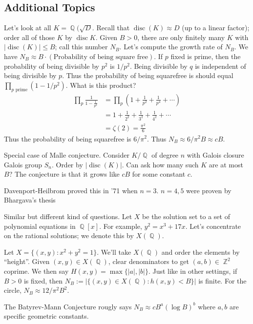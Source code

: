 \documentclass[11pt, a4paper]{memoir}
\DeclareMathOperator{\Q}{{\mathbb{Q}}}
\DeclareMathOperator{\Z}{{\mathbb{Z}}}
\theoremstyle{change}
\theoremstyle{plain}
\theoremstyle{nonumberplain}
\DeclareMathOperator{\disc}{disc}
\numberwithin{equation}{section}
\begin{document}
\subsection{Additional Topics}
Let's look at all $K=\Q(\sqrt{D}$.
Recall that $\disc(K)\approx D$ (up to a linear factor); order all of those $K$ by $\disc K$.
Given $B>0$, there are only finitely many $K$ with $|\disc(K)|\leq B$; call this number $N_B$.
Let's compute the growth rate of $N_B$.
We have $N_B\approx B\cdot(\text{Probability of being square free})$.
If $p$ fixed is prime, then the probability of being divisible by $p^2$ is $1/p^2$.
Being divisible by $q$ is independent of being divisible by $p$.
Thus the probability of being squarefree is should equal $\prod_{p\text{ prime}}(1-1/p^2)$.
What is this product?
\begin{align*}
    \prod_p\frac{1}{1-\frac{1}{p^2}} &= \prod_p\left(1+\frac{1}{p^2}+\frac{1}{p^4}+\cdots\right)\\
                                     &= 1+\frac{1}{2^2}+\frac{1}{3^2}+\frac{1}{4^2}+\cdots\\
                                     &= \zeta(2)=\frac{\pi^2}{6}
\end{align*}
Thus the probability of being squarefree is $6/\pi^2$.
Thus $N_B\approx 6/\pi^2 B\approx cB$.

Special case of Malle conjecture.
Consider $K/\Q$ of degree $n$ with Galois closure Galois group $S_n$.
Order by $|\disc(K)|$.
Can ask how many such $K$ are at most $B$?
The conjecture is that it grows like $cB$ for some constant $c$.

Davenport-Heilbrom proved this in '71 when $n=3$.
$n=4,5$ were proven by Bhargava's thesis

Similar but different kind of questions.
Let $X$ be the solution set to a set of polynomial equations in $\Q[x]$.
For example, $y^2=x^3+17x$.
Let's concentrate on the rational solutions; we denote this by $X(\Q)$.

Let $X=\{(x,y):x^2+y^2=1\}$.
We'll take $X(\Q)$ and order the elements by ``height''.
Given $(x,y)\in X(\Q)$, clear denominators to get $(a,b)\in\Z^2$ coprime.
We then say $H(x,y)=\max\{|a|,|b|\}$.
Just like in other settings, if $B>0$ is fixed, then $N_B:=|\{(x,y)\in X(\Q):h(x,y)<B\}|$ is finite.
For the circle, $N_B\approx 12/\pi^2 B^2$.

The Batyrev-Mann Conjecture rougly says $N_B\approx cB^a(\log B)^b$ where $a,b$ are specific geometric constants.
\end{document}
